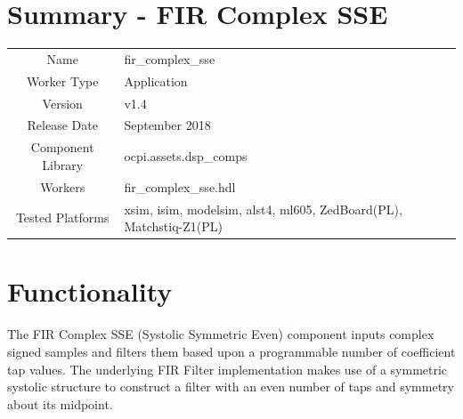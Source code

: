 \documentclass{article}
\author{} %
\date{Version \docVersion} %
\title{\docTitle}
\def\docVersion{1.4}
\def\comp{fir\_complex\_sse}
\def\Comp{FIR Complex SSE}
\begin{document}
\section*{Summary - \Comp}

\begin{center}
\end{center}

\begin{tabular}{|c|M{13.5cm}|}
	\hline
	                  &                                                              \\
	\hline
	Name              & \comp                                                        \\
	\hline
	Worker Type       & Application                                                  \\
	\hline
	Version           & v\docVersion \\
	\hline
	Release Date      & September 2018 \\
	\hline
	Component Library & ocpi.assets.dsp\_comps                                        \\
	\hline
	Workers           & \comp.hdl                                                    \\
	\hline
	Tested Platforms  & xsim, isim, modelsim, alst4, ml605, ZedBoard(PL), Matchstiq-Z1(PL) \\
	\hline
\end{tabular}

\section*{Functionality}
\begin{flushleft}
	The FIR Complex SSE (Systolic Symmetric Even) component inputs complex signed samples and filters them based upon a programmable number of coefficient tap values. The underlying FIR Filter implementation makes use of a symmetric systolic structure to construct a filter with an even number of taps and symmetry about its midpoint.
\end{flushleft}
\end{document}
